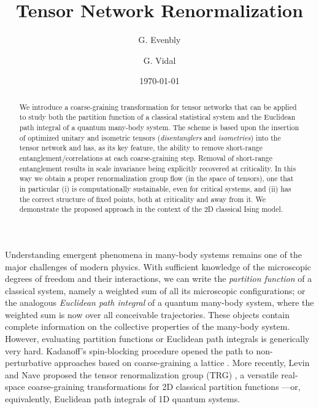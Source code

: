 \documentclass[aps,prl,twocolumn,showpacs,superscriptaddress,floatfix,10pt]{revtex4-1}
\begin{document}
\title{Tensor Network Renormalization}

\author{G. Evenbly}
\author{G. Vidal}
  
\date{\today}

\begin{abstract}
We introduce a coarse-graining transformation for tensor networks that can be applied to study both the partition function of a classical statistical system and the Euclidean path integral of a quantum many-body system. The scheme is based upon the insertion of optimized unitary and isometric tensors (\textit{disentanglers} and \textit{isometries}) into the tensor network and has, as its key feature, the ability to remove short-range entanglement/correlations at each coarse-graining step. Removal of short-range entanglement results in scale invariance being explicitly recovered at criticality. In this way we obtain a proper renormalization group flow (in the space of tensors), one that in particular (i) is computationally sustainable, even for critical systems, and (ii) has the correct structure of fixed points, both at criticality and away from it. We demonstrate the proposed approach in the context of the 2D classical Ising model.  
\end{abstract}


\maketitle

Understanding emergent phenomena in many-body systems remains one of the major challenges of modern physics. With sufficient knowledge of the microscopic degrees of freedom and their interactions, we can write the \textit{partition function} of a classical system, namely a weighted sum of all its microscopic configurations; or the analogous \textit{Euclidean path integral} of a quantum many-body system, where the weighted sum is now over all conceivable trajectories. These objects contain complete information on the collective properties of the many-body system. However, evaluating partition functions or Euclidean path integrals is generically very hard. Kadanoff's spin-blocking procedure \cite{Kadanoff} opened the path to non-perturbative approaches based on coarse-graining a lattice \cite{Wilson,DMRG}. More recently, Levin and Nave proposed the tensor renormalization group (TRG) \cite{TRG}, a versatile real-space coarse-graining transformations for 2D classical partition functions ---or, equivalently, Euclidean path integrals of 1D quantum systems.   
\end{document}
